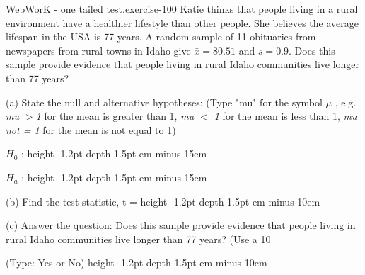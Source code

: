 \documentclass[10pt,]{book}
\newcommand{\fillin}[1]{\leavevmode\leaders\vrule height -1.2pt depth 1.5pt \hskip #1em minus #1em \null}
\numberwithin{equation}{section}
\newcommand{\lt}{<}
\begin{document}
\begin{inlineexercise}{WebWorK - one tailed test.}{exercise-100}%
\hypertarget{p-1417}{}%
Katie thinks that people living in a rural environment have a healthier lifestyle than other people.  She believes the average lifespan in the USA is 77 years. A random sample of 11 obituaries from newspapers from rural towns in Idaho give \(\bar{x} = 80.51\) and \(s = 0.9\).  Does this sample provide evidence that people living in rural Idaho communities live longer than 77 years?%
\par
\hypertarget{p-1418}{}%
(a) State the null and alternative hypotheses:  (Type "mu" for the symbol \(\mu\) , e.g.  \emph{mu \(>\)1} for the mean is greater than 1,  \emph{mu \(\lt \) 1} for the mean is less than 1, \emph{mu not = 1} for the mean is not equal to 1)%
\par
\hypertarget{p-1419}{}%
\(H_0\) :  \fillin{15}%
\par
\hypertarget{p-1420}{}%
\(H_a\) :  \fillin{15}%
\par
\hypertarget{p-1421}{}%
(b) Find the test statistic, t =   \fillin{10}%
\par
\hypertarget{p-1422}{}%
(c) Answer the question: Does this sample provide evidence that people living in rural Idaho communities live longer than 77 years? (Use a 10%
\par
\hypertarget{p-1423}{}%
(Type: Yes or No)  \fillin{10}%
\end{inlineexercise}
%
%
%
\typeout{************************************************}
\typeout{************************************************}
%
\end{document}
